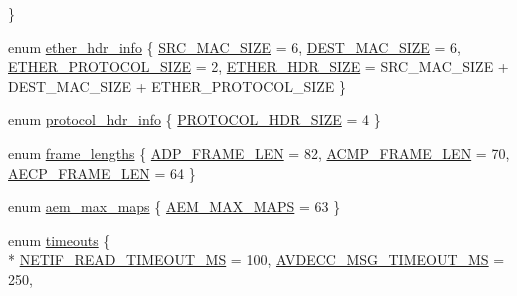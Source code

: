 \begin{DoxyCompactItemize}
 \}
\item 
enum \hyperlink{namespaceavdecc__lib_a6c827b1a0d973e18119c5e3da518e65c}{ether\+\_\+hdr\+\_\+info} \{ \hyperlink{namespaceavdecc__lib_a6c827b1a0d973e18119c5e3da518e65ca47bc1bfd251228bd69c00a6313167289}{S\+R\+C\+\_\+\+M\+A\+C\+\_\+\+S\+I\+ZE} = 6, 
\hyperlink{namespaceavdecc__lib_a6c827b1a0d973e18119c5e3da518e65ca72afc5a69430999f92aef92a795e28cd}{D\+E\+S\+T\+\_\+\+M\+A\+C\+\_\+\+S\+I\+ZE} = 6, 
\hyperlink{namespaceavdecc__lib_a6c827b1a0d973e18119c5e3da518e65ca98f2963240c9a606cde20e76e801b53c}{E\+T\+H\+E\+R\+\_\+\+P\+R\+O\+T\+O\+C\+O\+L\+\_\+\+S\+I\+ZE} = 2, 
\hyperlink{namespaceavdecc__lib_a6c827b1a0d973e18119c5e3da518e65ca9512ad9b34302ba7048d88197e0a2dc0}{E\+T\+H\+E\+R\+\_\+\+H\+D\+R\+\_\+\+S\+I\+ZE} = S\+R\+C\+\_\+\+M\+A\+C\+\_\+\+S\+I\+ZE + D\+E\+S\+T\+\_\+\+M\+A\+C\+\_\+\+S\+I\+ZE + E\+T\+H\+E\+R\+\_\+\+P\+R\+O\+T\+O\+C\+O\+L\+\_\+\+S\+I\+ZE
 \}
\item 
enum \hyperlink{namespaceavdecc__lib_afbe15cecee5d58e1587deaeee0f927da}{protocol\+\_\+hdr\+\_\+info} \{ \hyperlink{namespaceavdecc__lib_afbe15cecee5d58e1587deaeee0f927daaca413724c7efb47f13b5f929e582d8cc}{P\+R\+O\+T\+O\+C\+O\+L\+\_\+\+H\+D\+R\+\_\+\+S\+I\+ZE} = 4
 \}
\item 
enum \hyperlink{namespaceavdecc__lib_a2b5e266e2064669372f6c59e977c6c88}{frame\+\_\+lengths} \{ \hyperlink{namespaceavdecc__lib_a2b5e266e2064669372f6c59e977c6c88a501d4a1d733ed27e4010c3dd55b67909}{A\+D\+P\+\_\+\+F\+R\+A\+M\+E\+\_\+\+L\+EN} = 82, 
\hyperlink{namespaceavdecc__lib_a2b5e266e2064669372f6c59e977c6c88a72da19de32961d6bc4541a6d7408b6e2}{A\+C\+M\+P\+\_\+\+F\+R\+A\+M\+E\+\_\+\+L\+EN} = 70, 
\hyperlink{namespaceavdecc__lib_a2b5e266e2064669372f6c59e977c6c88af1a7d677d6d8ee66a9b7bb1f960ab1db}{A\+E\+C\+P\+\_\+\+F\+R\+A\+M\+E\+\_\+\+L\+EN} = 64
 \}
\item 
enum \hyperlink{namespaceavdecc__lib_a97844c4fa619487e53c2854a07fd34d7}{aem\+\_\+max\+\_\+maps} \{ \hyperlink{namespaceavdecc__lib_a97844c4fa619487e53c2854a07fd34d7aeea9bc815c3177c9b296244acb544cc9}{A\+E\+M\+\_\+\+M\+A\+X\+\_\+\+M\+A\+PS} = 63
 \}
\item 
enum \hyperlink{namespaceavdecc__lib_a5672955abd1a38146bde28647367857e}{timeouts} \{ \\*
\hyperlink{namespaceavdecc__lib_a5672955abd1a38146bde28647367857ea9f482edcc88a7e03cdc36932fb9fa8fd}{N\+E\+T\+I\+F\+\_\+\+R\+E\+A\+D\+\_\+\+T\+I\+M\+E\+O\+U\+T\+\_\+\+MS} = 100, 
\hyperlink{namespaceavdecc__lib_a5672955abd1a38146bde28647367857ea3e235a94e9e3d91317afd7bdbb3844c1}{A\+V\+D\+E\+C\+C\+\_\+\+M\+S\+G\+\_\+\+T\+I\+M\+E\+O\+U\+T\+\_\+\+MS} = 250, 

\end{DoxyCompactItemize}
